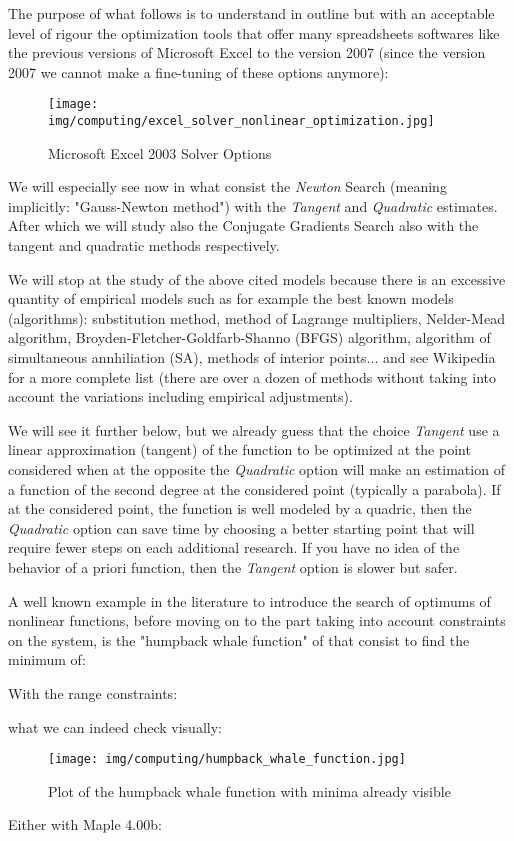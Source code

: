 	The purpose of what follows is to understand in outline but with an acceptable level of rigour the optimization tools that offer many spreadsheets softwares like the previous versions of Microsoft Excel to the version 2007 (since the version 2007 we cannot make a fine-tuning of these options anymore):
	\begin{figure}[H]
		\centering
		\texttt{[image: img/computing/excel\_solver\_nonlinear\_optimization.jpg]}
		\caption{Microsoft Excel 2003 Solver Options}
	\end{figure}
	 We will especially see now in what consist the \textit{Newton} Search (meaning implicitly: "Gauss-Newton method") with the \textit{Tangent} and \textit{Quadratic} estimates. After which we will study also the Conjugate Gradients Search also with the tangent and quadratic methods respectively.
	 \begin{tcolorbox}[title=Remark,colframe=black,arc=10pt]
	We will stop at the study of the above cited models because there is an excessive quantity of empirical models such as for example the best known models (algorithms): substitution method, method of Lagrange multipliers, Nelder-Mead algorithm, Broyden-Fletcher-Goldfarb-Shanno (BFGS) algorithm, algorithm  of simultaneous annhiliation (SA), methods of interior points... and see Wikipedia for a more complete list (there are over a dozen of methods without taking into account the variations including empirical adjustments).
	\end{tcolorbox}
	We will see it further below, but we already guess that the choice \textit{Tangent} use a linear approximation (tangent) of the function to be optimized at the point considered when at the opposite the \textit{Quadratic} option will make an estimation of a function of the second degree at the considered point (typically a parabola). If at the considered point, the function is well modeled by a quadric, then the \textit{Quadratic} option can save time by choosing a better starting point that will require fewer steps on each additional research. If you have no idea of the behavior of a priori function, then the  \textit{Tangent} option is slower but safer.
	
	A well known example in the literature to introduce the search of optimums of nonlinear functions, before moving on to the part taking into account constraints on the system, is the "humpback whale function" of that consist to find the minimum of:
	
	With the range constraints:
	
	what we can indeed check visually:
	\begin{figure}[H]
		\centering
		\texttt{[image: img/computing/humpback\_whale\_function.jpg]}
		\caption{Plot of the humpback whale function with minima already visible}
	\end{figure}
	Either with Maple 4.00b:
	
